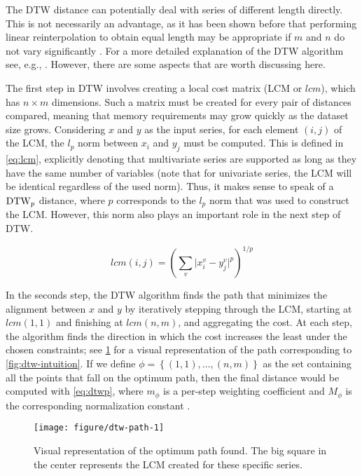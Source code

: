 The DTW distance can potentially deal with series of different length directly.
This is not necessarily an advantage,
as it has been shown before that performing linear reinterpolation to obtain equal length may be appropriate if $m$ and $n$ do not vary significantly \citep{keogh2004}.
For a more detailed explanation of the DTW algorithm see, e.g., \citet{giorgino2009}.
However, there are some aspects that are worth discussing here.

The first step in DTW involves creating a local cost matrix (LCM  or $lcm$),
which has $n \times m$ dimensions.
Such a matrix must be created for every pair of distances compared,
meaning that memory requirements may grow quickly as the dataset size grows.
Considering $x$ and $y$ as the input series,
for each element $(i,j)$ of the LCM,
the $l_p$ norm between $x_i$ and $y_j$ must be computed.
This is defined in \cref{eq:lcm},
explicitly denoting that multivariate series are supported as long as they have the same number of variables
(note that for univariate series, the LCM will be identical regardless of the used norm).
Thus, it makes sense to speak of a $\text{DTW}_p{}$ distance,
where $p$ corresponds to the $l_p$ norm that was used to construct the LCM.
However, this norm also plays an important role in the next step of DTW.

\begin{equation}
\label{eq:lcm}
lcm(i,j) = \left( \sum_v \lvert x^v_i - y^v_j \rvert ^ p \right) ^ {1/p}
\end{equation}

In the seconds step,
the DTW algorithm finds the path that minimizes the alignment between $x$ and $y$ by iteratively stepping through the LCM,
starting at $lcm(1,1)$ and finishing at $lcm(n,m)$,
and aggregating the cost.
At each step, the algorithm finds the direction in which the cost increases the least under the chosen constraints;
see \cref{fig:dtw-path} for a visual representation of the path corresponding to \cref{fig:dtw-intuition}.
If we define $\phi = \left\{ (1,1), \ldots, (n,m) \right\}$ as the set containing all the points that fall on the optimum path,
then the final distance would be computed with \cref{eq:dtwp},
where $m_\phi$ is a per-step weighting coefficient and $M_\phi$ is the corresponding normalization constant \citep{giorgino2009}.

\begin{figure}[htbp]

{\centering \texttt{[image: figure/dtw-path-1]}

}

\caption{Visual representation of the optimum path found. The big square in the center represents the LCM created for these specific series.}\label{fig:dtw-path}
\end{figure}

